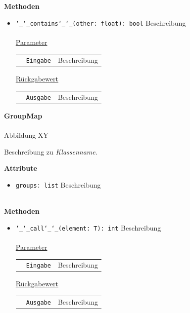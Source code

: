 \documentclass{article}
\begin{document}
\textbf{{Methoden}}
\begin{itemize}
\item \texttt{\char`_\char`_contains\char`_\char`_(other: float): bool} \newline Beschreibung
\\\\
\underline{{Parameter}}

\begin{tabular}{lll}
 & \texttt{Eingabe} & Beschreibung \\
\end{tabular}

\underline{{Rückgabewert}}

\begin{tabular}{lll}
 & \texttt{Ausgabe} & Beschreibung \\
\end{tabular}
\end{itemize}


\newpage
\textbf{\large{GroupMap}}\\\\
Abbildung XY

Beschreibung zu \textit{Klassenname}.
\newline \newline

\textbf{{Attribute}}
\begin{itemize}
\item \texttt{groups: list} \newline Beschreibung
\\\\
\end{itemize}

\textbf{{Methoden}}
\begin{itemize}
\item \texttt{\char`_\char`_call\char`_\char`_(element: T): int} \newline Beschreibung
\\\\
\underline{{Parameter}}

\begin{tabular}{lll}
 & \texttt{Eingabe} & Beschreibung \\
\end{tabular}

\underline{{Rückgabewert}}

\begin{tabular}{lll}
 & \texttt{Ausgabe} & Beschreibung \\
\end{tabular}
\end{itemize}
\end{document}
